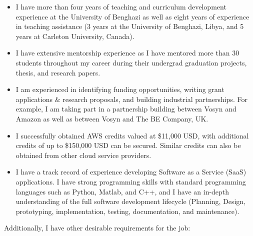 \documentclass[letterpaper,11pt,oneside]{article}
\begin{document}
\begin{itemize}
    \item I have more than four years of teaching and curriculum development experience at the University of Benghazi as well as eight years of experience in teaching assistance (3 years at the University of Benghazi, Libya, and 5 years at Carleton University, Canada). %
    \item I have extensive mentorship experience as I have mentored more than 30 students throughout my career during their undergrad graduation projects, thesis, and research papers. %
    \item I am experienced in identifying funding opportunities, writing grant applications \& research proposals, and building industrial partnerships. For example, I am taking part in a partnership building between Vosyn and Amazon as well as between Vosyn and The BE Company, UK.

   \item I successfully obtained AWS credits valued at \$11,000 USD, with additional credits of up to \$150,000 USD can be secured. Similar credits can also be obtained from other cloud service providers.
   

\item %
    I have a track record of experience developing Software as a Service (SaaS) applications. I have strong programming skills with standard programming languages such as Python, Matlab, and C++, and  I have an in-depth understanding of the full software development lifecycle (Planning, Design, prototyping, implementation, testing, documentation, and maintenance).

    
\end{itemize}

\vspace{1em}

Additionally, I have other desirable requirements for the job:
\end{document}
